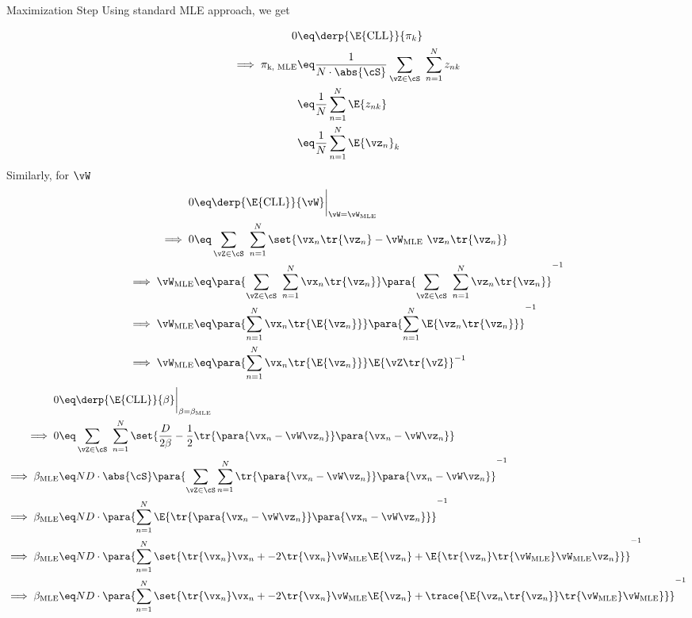 \documentclass{article}
\begin{document}
\begin{question}
\begin{qsubsection}{Maximization Step}
		Using standard MLE approach, we get
		\begin{enumerate}
				\begin{align*}
					0	&\eq	\derp{\E{\text{CLL}}}{\pi_k}\\
					\implies \pi_{\text{k, MLE}}	&\eq	\frac{1}{N \cdot \abs{\cS}} \sum_{\vZ \in \cS}\ \sum_{n = 1}^N {z_{nk}} \\
					&\eq	\frac{1}{N} \sum_{n = 1}^N \E{z_{nk}} \\
					&\eq	\frac{1}{N} \sum_{n = 1}^N \E{\vz_n}_k
				\end{align*}
				\ditem[MLE of $\vW$]
				Similarly, for $\vW$
				\begin{align*}
					0	&\eq	\derp{\E{\text{CLL}}}{\vW} \bigg|_{\vW = \vW_{\text{MLE}}}\\
					\implies 0	&\eq	\sum_{\vZ \in \cS}\ \sum_{n = 1}^N \set{\vx_n \tr{\vz_n} - \vW_{\text{MLE}}\ \vz_n \tr{\vz_n}}\\
					\implies \vW_{\text{MLE}}	&\eq	\para{\sum_{\vZ \in \cS}\ \sum_{n = 1}^N \vx_n \tr{\vz_n}} \para{\sum_{\vZ \in \cS}\ \sum_{n = 1}^N \vz_n \tr{\vz_n}}^{-1} \\
					\implies \vW_{\text{MLE}}	&\eq	\para{\sum_{n = 1}^N \vx_n \tr{\E{\vz_n}}} \para{\sum_{n = 1}^N \E{\vz_n \tr{\vz_n}}}^{-1} \\
					\implies \vW_{\text{MLE}}	&\eq	\para{\sum_{n = 1}^N \vx_n \tr{\E{\vz_n}}} \E{\vZ \tr{\vZ}}^{-1}
				\end{align*}
				\begin{align*}
					0	&\eq	\derp{\E{\text{CLL}}}{\beta} \bigg|_{\beta = \beta_{\text{MLE}}} \\
					\implies 0	&\eq	\sum_{\vZ \in \cS}\ \sum_{n = 1}^N \set{\frac{D}{2 \beta} - \frac{1}{2} \tr{\para{\vx_n - \vW \vz_n}} \para{\vx_n - \vW \vz_n}} \\
					\implies \beta_{\text{MLE}}	&\eq	N D \cdot \abs{\cS} \para{\sum_{\vZ \in \cS} \sum_{n = 1}^N \tr{\para{\vx_n - \vW \vz_n}} \para{\vx_n - \vW \vz_n}}^{-1} \\
					\implies \beta_{\text{MLE}}	&\eq	N D \cdot \para{\sum_{n = 1}^N \E{\tr{\para{\vx_n - \vW \vz_n}} \para{\vx_n - \vW \vz_n}}}^{-1} \\
					\implies \beta_{\text{MLE}}	&\eq	N D \cdot \para{\sum_{n = 1}^N \set{\tr{\vx_n} \vx_n + - 2 \tr{\vx_n} \mleW \E{\vz_n} + \E{\tr{\vz_n} \tr{\mleW} \mleW \vz_n}}}^{-1} \\
					\implies \beta_{\text{MLE}}	&\eq	N D \cdot \para{\sum_{n = 1}^N \set{\tr{\vx_n} \vx_n + - 2 \tr{\vx_n} \mleW \E{\vz_n} + \trace{\E{\vz_n \tr{\vz_n}} \tr{\mleW} \mleW}}}^{-1}
				\end{align*}
		\end{enumerate}


\end{qsubsection}
\end{question}
\end{document}
